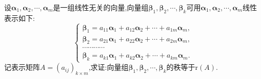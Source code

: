 \documentclass[lang=cn,newtx,10pt,scheme=chinese]{elegantbook}
\begin{document}
\begin{proposition}\label{proposition:线性无关向量组的命题6}
设\(\boldsymbol{\alpha}_1,\boldsymbol{\alpha}_2,\cdots,\boldsymbol{\alpha}_m\)是一组线性无关的向量,向量组\(\boldsymbol{\beta}_1,\boldsymbol{\beta}_2,\cdots,\boldsymbol{\beta}_k\)可用\(\boldsymbol{\alpha}_1,\boldsymbol{\alpha}_2,\cdots,\boldsymbol{\alpha}_m\)线性表示如下:
\[
\begin{cases}
\boldsymbol{\beta}_1 = a_{11}\boldsymbol{\alpha}_1 + a_{12}\boldsymbol{\alpha}_2+\cdots + a_{1m}\boldsymbol{\alpha}_m,\\
\boldsymbol{\beta}_2 = a_{21}\boldsymbol{\alpha}_1 + a_{22}\boldsymbol{\alpha}_2+\cdots + a_{2m}\boldsymbol{\alpha}_m,\\
\cdots\cdots\cdots\cdots\\
\boldsymbol{\beta}_k = a_{k1}\boldsymbol{\alpha}_1 + a_{k2}\boldsymbol{\alpha}_2+\cdots + a_{km}\boldsymbol{\alpha}_m.
\end{cases}
\]
记表示矩阵\(A=(a_{ij})_{k\times m}\),求证:向量组\(\boldsymbol{\beta}_1,\boldsymbol{\beta}_2,\cdots,\boldsymbol{\beta}_k\)的秩等于\(\text{r}(A)\).
\end{proposition}
\end{document}
